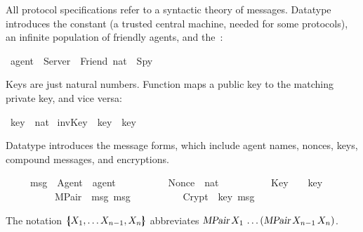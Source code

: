 %
\begin{isabellebody}%
\def\isabellecontext{Message}%
%
\isadelimtheory
%
\endisadelimtheory
%
\isatagtheory
%
\endisatagtheory
{\isafoldtheory}%
%
\isadelimtheory
%
\endisadelimtheory
%
\isadelimproof
%
\endisadelimproof
%
\isatagproof
%
\endisatagproof
{\isafoldproof}%
%
\isadelimproof
%
\endisadelimproof
%
\isamarkuptrue%
%
\begin{isamarkuptext}%
All protocol specifications refer to a syntactic theory of messages. 
Datatype
 introduces the constant  (a trusted central
machine, needed for some protocols), an infinite population of
friendly agents, and the~:%
\end{isamarkuptext}%
\isamarkuptrue%
\isamarkupfalse%
\ agent\ {}\ Server\ {}\ Friend\ nat\ {}\ Spy%
\begin{isamarkuptext}%
Keys are just natural numbers.  Function  maps a public key to
the matching private key, and vice versa:%
\end{isamarkuptext}%
\isamarkuptrue%
\isamarkupfalse%
\ key\ {}\ nat\isanewline
{}\isamarkupfalse%
\ invKey\ {}{}\ {}key\ {}\ key{}%
\isadelimproof
%
\endisadelimproof
%
\isatagproof
%
\endisatagproof
{\isafoldproof}%
%
\isadelimproof
%
\endisadelimproof
%
\begin{isamarkuptext}%
Datatype
 introduces the message forms, which include agent names, nonces,
keys, compound messages, and encryptions.%
\end{isamarkuptext}%
\isamarkuptrue%
\isamarkupfalse%
\isanewline
\ \ \ \ \ msg\ {}\ Agent\ \ agent\isanewline
\ \ \ \ \ \ \ \ \ {}\ Nonce\ \ nat\isanewline
\ \ \ \ \ \ \ \ \ {}\ Key\ \ \ \ key\isanewline
\ \ \ \ \ \ \ \ \ {}\ MPair\ \ msg\ msg\isanewline
\ \ \ \ \ \ \ \ \ {}\ Crypt\ \ key\ msg%
\begin{isamarkuptext}%
\noindent
The notation $\mathopen{\{\kern-.30em|} X\sb 1,\ldots X\sb{n-1},X\sb n\mathclose{|\kern-.32em\}}$
abbreviates
$\emph{\sl MPair}\,X\sb 1\,\ldots\allowbreak(\emph{\sl MPair}\,X\sb{n-1}\,X\sb n)$.


\end{isamarkuptext}
\end{isabellebody}
